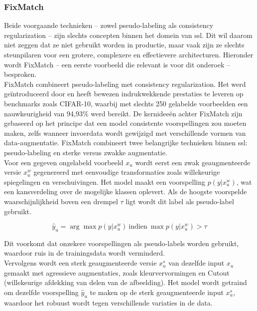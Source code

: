 \subsubsection{FixMatch}

Beide voorgaande technieken -- zowel pseudo-labeling als consistency regularization -- zijn slechts concepten binnen het domein van \gls{ssl}. Dit wil daarom niet zeggen dat ze niet gebruikt worden in productie, maar vaak zijn ze slechts steunpilaren voor een grotere, complexere en effectievere architecturen. Hieronder wordt FixMatch -- een eerste voorbeeld die relevant is voor dit onderoek -- besproken. \\

FixMatch combineert pseudo-labeling met consistency regularization. Het werd geïntroduceerd door \textcite{Sohn_2020} en heeft bewezen indrukwekkende prestaties te leveren op benchmarks zoals CIFAR-10, waarbij met slechts 250 gelabelde voorbeelden een nauwkeurigheid van 94,93\% werd bereikt. De kernideeën achter FixMatch zijn gebaseerd op het principe dat een model consistente voorspellingen zou moeten maken, zelfs wanneer invoerdata wordt gewijzigd met verschillende vormen van data-augmentatie. FixMatch combineert twee belangrijke technieken binnen \gls{ssl}: pseudo-labeling en sterke versus zwakke augmentatie. \\

Voor een gegeven ongelabeld voorbeeld $x_u$ wordt eerst een zwak geaugmenteerde versie $x_u^w$ gegenereerd met eenvoudige transformaties zoals willekeurige spiegelingen en verschuivingen. Het model maakt een voorspelling $p\left(y|x_u^w\right)$, wat een kansverdeling over de mogelijke klassen oplevert. Als de hoogste voorspelde waarschijnlijkheid boven een drempel $\tau$ ligt wordt dit label als pseudo-label gebruikt. 

$$
\hat{y}_u = \arg \max p\left(y|x_u^w\right) \ \text{indien} \ \max p\left(y|x_u^w\right) > \tau
$$

Dit voorkomt dat onzekere voorspellingen als pseudo-labels worden gebruikt, waardoor ruis in de trainingsdata wordt verminderd. \\

Vervolgens wordt een sterk geaugmenteerde versie $x_u^s$ van dezelfde input $x_u$ gemaakt met agressieve augmentaties, zoals kleurvervormingen en Cutout (willekeurige afdekking van delen van de afbeelding). \autocite{DeVries_2017} Het model wordt getraind om dezelfde voorspelling $\hat{y}_u$ te maken op de sterk geaugmenteerde input $x_u^s$, waardoor het robuust wordt tegen verschillende variaties in de data. \\

